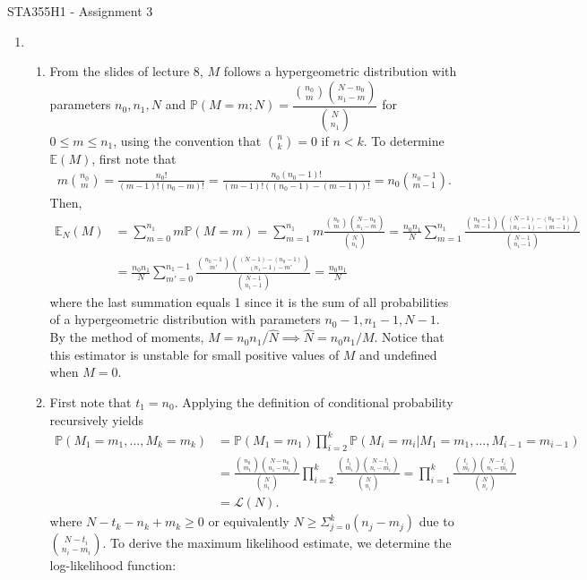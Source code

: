 \documentclass[12pt]{article}
\newcommand{\E}{\mathbb{E}}
\newcommand{\p}{\mathbb{P}}
\newcommand{\h}[1]{\hat{#1}}
\begin{document}
\begin{center}
{\Large STA355H1 - Assignment 3}
\end{center}

\begin{enumerate}
    \item
    \begin{enumerate}
        \item From the slides of lecture 8, $M$ follows a hypergeometric distribution with parameters $n_0,n_1,N$ and $\p(M=m;N)=\dfrac{\binom{n_0}{m}\binom{N-n_0}{n_1-m}}{\binom{N}{n_1}}$ for $0\leq m\leq n_1$, using the convention that $\binom{n}{k}=0$ if $n<k$. To determine $\E(M)$, first note that \begin{align*}
            m\binom{n_0}{m} = \frac{n_0!}{(m-1)!(n_0-m)!} = \frac{n_0(n_0-1)!}{(m-1)!((n_0-1)-(m-1))!} = n_0\binom{n_0-1}{m-1}.
        \end{align*} Then, \begin{align*}
            \E_N(M) &= \sum_{m=0}^{n_1} m\p(M=m) = \sum_{m=1}^{n_1} m\frac{\binom{n_0}{m}\binom{N-n_0}{n_1-m}}{\binom{N}{n_1}} = \frac{n_0n_1}{N}\sum_{m=1}^{n_1} \frac{\binom{n_0-1}{m-1}\binom{(N-1)-(n_0-1)}{(n_1-1)-(m-1)}}{\binom{N-1}{n_1-1}}\\
            &= \frac{n_0n_1}{N}\sum_{m'=0}^{n_1-1} \frac{\binom{n_0-1}{m'}\binom{(N-1)-(n_0-1)}{(n_1-1)-m'}}{\binom{N-1}{n_1-1}} = \frac{n_0n_1}{N}
        \end{align*} where the last summation equals 1 since it is the sum of all probabilities of a hypergeometric distribution with parameters $n_0-1,n_1-1,N-1$. By the method of moments, $M=n_0n_1/\h{N}\implies\h{N}=n_0n_1/M$. Notice that this estimator is unstable for small positive values of $M$ and undefined when $M=0$.
        \item First note that $t_1 = n_0$. Applying the definition of conditional probability recursively yields \begin{align*}
            \p(M_1=m_1,\ldots,M_k=m_k) &= \p(M_1=m_1)\prod_{i=2}^k \p(M_i=m_i|M_1=m_1,\ldots,M_{i-1}=m_{i-1})\\
            &= \frac{\binom{n_0}{m_1}\binom{N-n_0}{n_1-m_1}}{\binom{N}{n_1}} \prod_{i=2}^k \frac{\binom{t_i}{m_i}\binom{N-t_i}{n_i-m_i}}{\binom{N}{n_i}} = \prod_{i=1}^k \frac{\binom{t_i}{m_i}\binom{N-t_i}{n_i-m_i}}{\binom{N}{n_i}}\\
            &= \mathcal{L}(N).
        \end{align*} where $N-t_k-n_k+m_k\geq 0$ or equivalently $N\geq\Sigma_{j=0}^k(n_j-m_j)$ due to $\binom{N-t_i}{n_i-m_i}$. To derive the maximum likelihood estimate, we determine the log-likelihood function: \begin{align*}

\end{align*}
\end{enumerate}
\end{enumerate}
\end{document}
